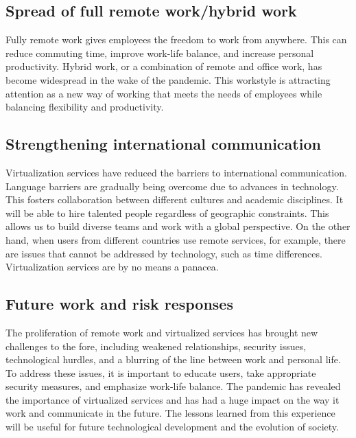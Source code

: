 \documentclass[12pt]{article}
\begin{document}
\subsection{Spread of full remote work/hybrid work}
Fully remote work gives employees the freedom to work from anywhere. This can
reduce commuting time, improve work-life balance, and increase personal
productivity. Hybrid work, or a combination of remote and office work, has
become widespread in the wake of the pandemic. This workstyle is attracting
attention as a new way of working that meets the needs of employees while
balancing flexibility and productivity.

\subsection{Strengthening international communication}
Virtualization services have reduced the barriers to international
communication. Language barriers are gradually being overcome due to advances
in technology. This fosters collaboration between different cultures and
academic disciplines. It will be able to hire talented people regardless of
geographic constraints. This allows us to build diverse teams and work with a
global perspective. On the other hand, when users from different countries use
remote services, for example, there are issues that cannot be addressed by
technology, such as time differences. Virtualization services are by no means a
panacea.

\subsection{Future work and risk responses}
The proliferation of remote work and virtualized services has brought new
challenges to the fore, including weakened relationships, security issues,
technological hurdles, and a blurring of the line between work and personal
life. To address these issues, it is important to educate users, take
appropriate security measures, and emphasize work-life balance. The pandemic
has revealed the importance of virtualized services and has had a huge impact
on the way it work and communicate in the future. The lessons learned from this
experience will be useful for future technological development and the
evolution of society.



\end{document}
